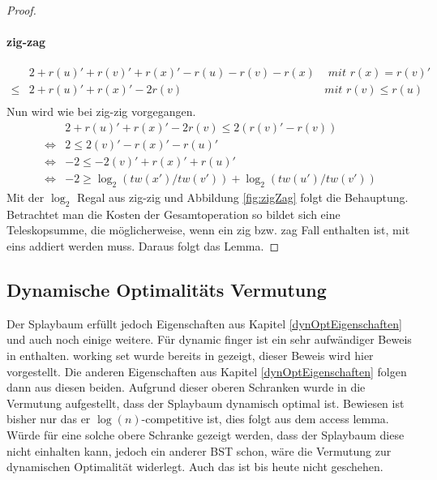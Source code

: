 \documentclass[a4paper,12pt]{article}
\begin{document}
\begin{proof}
\paragraph{zig-zag} 
\begin{align*}
&2 + r\left(u\right)' +r\left(v\right)' +r\left(x\right)' - r\left(u\right)- r\left(v\right)- r\left(x\right) &\textit{ mit $r\left(x\right) =  r\left(v\right)'$ }\\
\leq& 2 + r\left(u\right)' +r\left(x\right)' - 2 r\left(v\right) &\textit{mit $r\left(v\right) \leq  r\left(u\right)$}\\
\end{align*}
Nun wird wie bei zig-zig vorgegangen.
\begin{align*}
&  2 + r\left(u\right)' +r\left(x\right)' - 2 r\left(v\right) \leq  2\left(r\left(v\right)'- r\left(v\right)\right)\\
\Leftrightarrow &2 \leq 2\left(v\right)' -  r\left(x\right)' - r\left(u\right)'\\
\Leftrightarrow &-2 \leq -2\left(v\right)' +  r\left(x\right)' + r\left(u\right)'\\
\Leftrightarrow & -2 \geq \log_2\left(\mathit{tw}\left(x'\right) / \mathit{tw}\left(v'\right)\right) + \log_2\left(\mathit{tw}\left(u'\right) / \mathit{tw}\left(v'\right)\right)
\end{align*}
Mit der $\log_2$ Regal aus zig-zig und Abbildung \ref{fig:zigZag} folgt die Behauptung.
Betrachtet man die Kosten der Gesamtoperation so bildet sich eine Teleskopsumme, die möglicherweise, wenn ein  zig bzw. zag Fall enthalten ist, mit eins addiert werden muss. Daraus folgt das Lemma.
\end{proof}

\subsection{Dynamische Optimalitäts Vermutung}
 Der Splaybaum erfüllt  jedoch Eigenschaften aus Kapitel \ref{dynOptEigenschaften} und auch noch einige weitere. Für dynamic finger ist ein sehr aufwändiger Beweis in \cite{dynFInger} enthalten. working set wurde bereits in \cite{splay} gezeigt, dieser Beweis wird hier vorgestellt. Die anderen Eigenschaften aus Kapitel \ref{dynOptEigenschaften} folgen dann aus diesen beiden. Aufgrund dieser oberen Schranken wurde in \cite{splay} die Vermutung aufgestellt, dass der Splaybaum dynamisch optimal ist. Bewiesen ist bisher nur das er $\log \left(n\right)$-competitive ist, dies folgt aus dem access lemma. Würde für eine solche obere Schranke gezeigt werden, dass der Splaybaum diese nicht einhalten kann, jedoch ein anderer BST schon, wäre die Vermutung zur dynamischen Optimalität widerlegt. Auch das ist bis heute nicht geschehen. 
 
\end{document}
